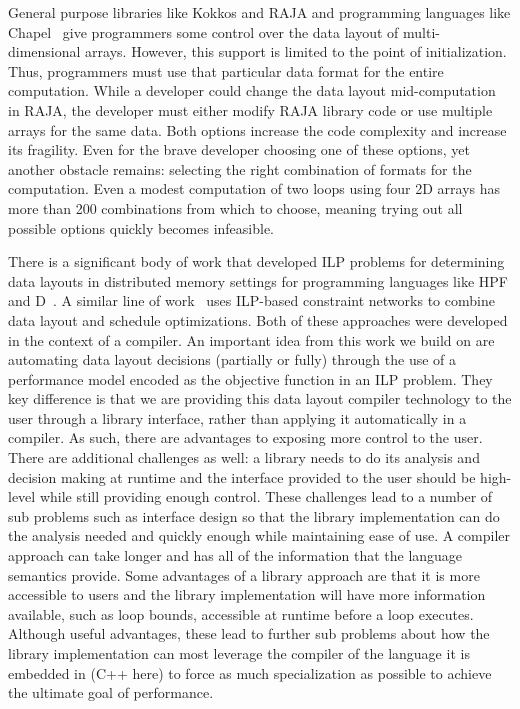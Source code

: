 \documentclass[sigconf,review=true]{acmart}
\begin{document}
General purpose libraries like Kokkos and RAJA and programming languages like Chapel~\cite{diaconescu2007approach} give programmers some control over the data layout of multi-dimensional arrays. However, this support is limited to the point of initialization.
Thus, programmers must use that particular data format for the entire computation.
While a developer could change the data layout mid-computation in RAJA, the developer must either modify RAJA library code or use multiple arrays for the same data. 
Both options increase the code complexity and increase its fragility.
Even for the brave developer choosing one of these options, yet another obstacle remains: selecting the right combination of formats for the computation.
Even a modest computation of two loops using four 2D arrays has more than 200 combinations from which to choose, meaning trying out all possible options quickly becomes infeasible. 

There is a significant body of work that developed ILP problems for determining data layouts in distributed memory settings for programming languages like HPF and D~\cite{bixby1994automatic,kennedy1995automatic,kennedy1998automatic}. 
A similar line of work~\cite{chen2004ilp,chen2005constraint,chen2005integrating, ozturk2011data} uses ILP-based constraint networks to combine data layout and schedule optimizations. 
Both of these approaches were developed in the context of a compiler. 
An important idea from this work we build on are automating data layout decisions (partially or fully) through the use of a performance model encoded as the objective function in an ILP problem.
They key difference is that we are providing this data layout compiler technology to the user through a library interface, rather than applying it automatically in a compiler. 
As such, there are advantages to exposing more control to the user. 
There are additional challenges as well: a library needs to do its analysis and decision making at runtime and the interface provided to the user should be high-level while still providing enough control. 
These challenges lead to a number of sub problems such as interface design so that the library implementation can do the analysis needed and quickly enough while maintaining ease of use.
A compiler approach can take longer and has all of the information that the language semantics provide.
Some advantages of a library approach are that it is more accessible to users and the library implementation will have more information available, such as loop bounds, accessible at runtime before a loop executes.
Although useful advantages, these lead to further sub problems about how the library implementation can most leverage the compiler of the language it is embedded in (C++ here) to force as much specialization as possible to achieve the ultimate goal of performance.
\end{document}
